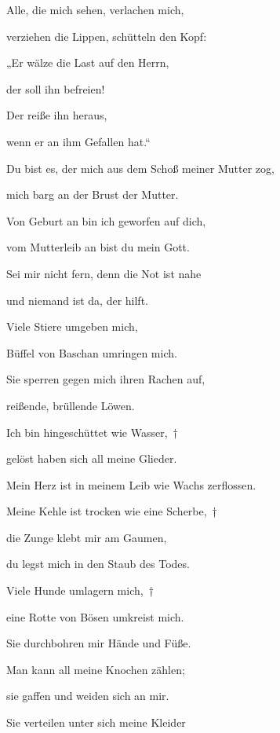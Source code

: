 \noindent Alle, die mich sehen, verlachen mich,~\GreStar{}~\nopagebreak

verziehen die Lippen, schütteln den Kopf:
 
\noindent „Er wälze die Last auf den Herrn,~\GreStar{}~\nopagebreak

der soll ihn befreien! 
 
\noindent Der reiße ihn heraus,~\GreStar{}~\nopagebreak

wenn er an ihm Gefallen hat.“
 
\noindent Du bist es, der mich aus dem Schoß meiner Mutter zog,~\GreStar{}~\nopagebreak

mich barg an der Brust der Mutter.
 
\noindent Von Geburt an bin ich geworfen auf dich,~\GreStar{}~\nopagebreak

vom Mutterleib an bist du mein Gott.
 
\noindent Sei mir nicht fern, denn die Not ist nahe~\GreStar{}~\nopagebreak

und niemand ist da, der hilft.
 
\noindent Viele Stiere umgeben mich,~\GreStar{}~\nopagebreak

Büffel von Baschan umringen mich.
 
\noindent Sie sperren gegen mich ihren Rachen auf,~\GreStar{}~\nopagebreak

reißende, brüllende Löwen.
 
\noindent Ich bin hingeschüttet wie Wasser,~†~\nopagebreak

gelöst haben sich all meine Glieder.~\GreStar{}~\nopagebreak

Mein Herz ist in meinem Leib wie Wachs zerflossen.
 
\noindent Meine Kehle ist trocken wie eine Scherbe,~†~\nopagebreak

die Zunge klebt mir am Gaumen,~\GreStar{}~\nopagebreak

du legst mich in den Staub des Todes.
 
\noindent Viele Hunde umlagern mich,~†~\nopagebreak

eine Rotte von Bösen umkreist mich.~\GreStar{}~\nopagebreak

Sie durchbohren mir Hände und Füße.
 
\noindent Man kann all meine Knochen zählen;~\GreStar{}~\nopagebreak

sie gaffen und weiden sich an mir.
 
\noindent Sie verteilen unter sich meine Kleider~\GreStar{}~\nopagebreak

